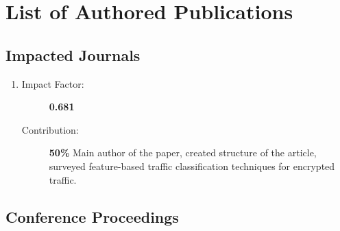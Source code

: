 \chapter{List of Authored Publications}



\section{Impacted Journals}

\begin{enumerate}
	\item {}
	\begin{description}
      \item[Impact Factor:] \textbf{0.681}
      \item[Contribution:] \textbf{50\%} Main author of the paper, created structure of the article, surveyed feature-based traffic classification techniques for encrypted traffic.
    \end{description}

\end{enumerate}

\section{Conference Proceedings}

